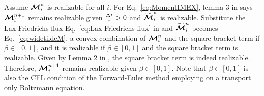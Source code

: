 Assume $\boldsymbol{\mathcal{M}}_{i}^{n}$ is realizable for all $i$. 
For Eq.~\eqref{eq:MomentIMEX}, lemma 3 in \cite{chu_etal_2018} says $\boldsymbol{\mathcal{M}}^{n+1}_{i}$ remains realizable given $\frac{\Delta t}{\tau} > 0$ and $\widetilde{\boldsymbol{\mathcal{M}}}^{n}_{i}$ is realizable.
Substitute the Lax-Friedrichs flux Eq.~\eqref{eq:Lax-Friedrichs flux} in and $\widetilde{\boldsymbol{\mathcal{M}}}^{n}_{i}$ becomes Eq.~\eqref{eq:widetildeM}, a convex combination of $\boldsymbol{\mathcal{M}}_{i}^{n}$ and the square bracket term if $\beta \in [0,1]$, and it is realizable if $\beta \in [0,1]$ and the square bracket term is realizable.
Given by Lemma 2 in \cite{chu_etal_2018}, the square bracket term is indeed realizable.
Therefore, $\boldsymbol{\mathcal{M}}^{n+1}_{i}$ remains realizable given $\beta \in [0,1]$.
Note that $\beta \in [0,1]$ is also the CFL condition of the Forward-Euler method employing on a transport only Boltzmann equation.

